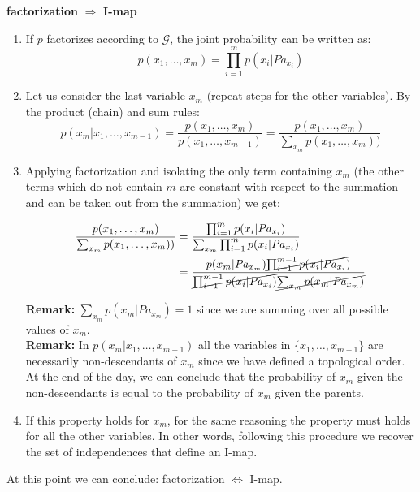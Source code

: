 \textbf{factorization} $\Rightarrow$ \textbf{I-map}
\begin{enumerate}
    \item If $p$ factorizes according to $\mathcal{G}$, the joint probability can be written as:
    $$p(x_1, \hdots, x_m) = \prod_{i=1}^m p(x_i | \mathit{Pa}_{x_i})$$
    
    \item Let us consider the last variable $x_m$ (repeat steps for the other variables). By the product (chain) and sum rules:
    $$p(x_m|x_1, \hdots, x_{m-1}) = \frac{p(x_1, \hdots, x_{m})}{p(x_1, \hdots, x_{m-1})} = \frac{p(x_1, \hdots, x_{m})}{\sum_{x_m} p(x_1, \hdots, x_{m}))}$$
    
    \item Applying factorization and isolating the only term containing $x_m$ (the other terms which do not contain $m$ are constant with respect to the summation and can be taken out from the summation) we get:
    
    \begin{align*}
        \frac{p(x_1, \hdots, x_{m})}{\sum_{x_m} p(x_1, \hdots, x_{m}))} &= \frac{\prod_{i=1}^m p(x_i | \mathit{Pa}_{x_i})}{\sum_{x_m} \prod_{i=1}^m p(x_i | \mathit{Pa}_{x_i})} \\
        &= \frac{p(x_m | \mathit{Pa}_{x_m}) \cancel{\prod_{i=1}^{m-1} p(x_i|\mathit{Pa}_{x_i})}}{\cancel{\prod_{i=1}^{m-1} p(x_i | \mathit{Pa}_{x_i})} \cancel{\sum_{x_m}p(x_m | \mathit{Pa}_{x_m})}}
    \end{align*}
    
    \textbf{Remark:} $\sum_{x_m}p(x_m | \mathit{Pa}_{x_m})=1$ since we are summing over all possible values of $x_m$.\\
    \textbf{Remark:} In $p(x_m | x_1, \hdots, x_{m-1})$ all the variables in $\{x_1, \hdots, x_{m-1}\}$ are necessarily non-descendants of $x_m$ since we have defined a topological order.\\
    At the end of the day, we can conclude that the probability of $x_m$ given the non-descendants is equal to the probability of $x_m$ given the parents.
    
    \item If this property holds for $x_m$, for the same reasoning the property must holds for all the other variables. In other words, following this procedure we recover the set of independences that define an I-map.
\end{enumerate}

At this point we can conclude: factorization $\Leftrightarrow$ I-map.

